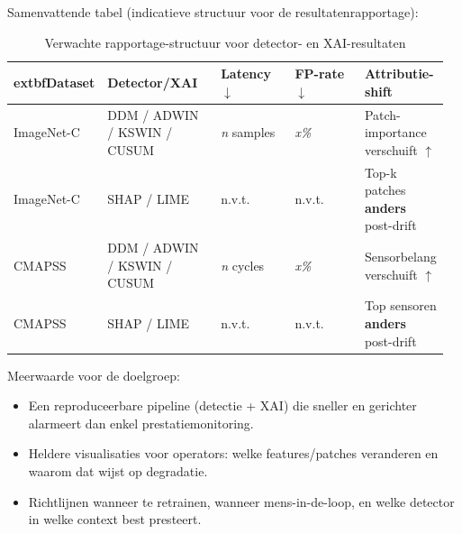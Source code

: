 


Samenvattende tabel (indicatieve structuur voor de resultatenrapportage):

\begin{table}[h]
	\centering
	\caption{Verwachte rapportage-structuur voor detector- en XAI-resultaten}
	\small
	\setlength{\tabcolsep}{4pt}
	\begin{tabular}{p{0.18\linewidth} p{0.26\linewidth} p{0.17\linewidth} p{0.16\linewidth} p{0.19\linewidth}}
		\hline
			extbf{Dataset} & \textbf{Detector/XAI} & \textbf{Latency $\downarrow$} & \textbf{FP-rate $\downarrow$} & \textbf{Attributie-shift} \\
		\hline
		ImageNet-C & DDM / ADWIN / KSWIN / CUSUM & \textit{n} samples & \textit{x\%} & Patch-importance verschuift $\uparrow$ \\
		ImageNet-C & SHAP / LIME & n.v.t. & n.v.t. & Top-k patches \textbf{anders} post-drift \\
		CMAPSS & DDM / ADWIN / KSWIN / CUSUM & \textit{n} cycles & \textit{x\%} & Sensorbelang verschuift $\uparrow$ \\
		CMAPSS & SHAP / LIME & n.v.t. & n.v.t. & Top sensoren \textbf{anders} post-drift \\
		\hline
	\end{tabular}
\end{table}

Meerwaarde voor de doelgroep:

\begin{itemize}
	\item Een reproduceerbare pipeline (detectie + XAI) die sneller en gerichter alarmeert dan enkel prestatiemonitoring.
	\item Heldere visualisaties voor operators: welke features/patches veranderen en waarom dat wijst op degradatie.
	\item Richtlijnen wanneer te retrainen, wanneer mens-in-de-loop, en welke detector in welke context best presteert.
\end{itemize}

